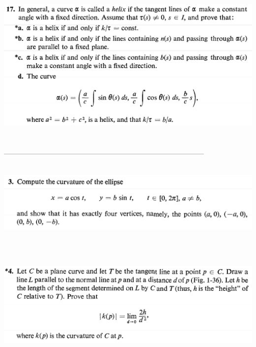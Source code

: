 \documentclass{report}
\begin{document}
\begin{question}{}{}
\includegraphics[height=8cm,width=18cm]{hw2q16}
\end{question}
---------------------------------------------------------------------------------------

\begin{question}{}{}
\includegraphics[height=4cm,width=18cm]{hw2q15}
\end{question}


\begin{question}{}{}
\includegraphics[height=6cm,width=18cm]{hw2q14}
\end{question}
\end{document}
